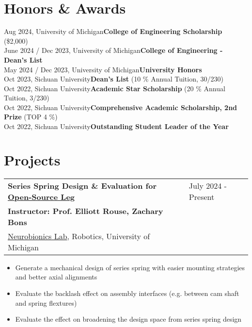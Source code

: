 \documentclass[letter,12pt]{article}
\begin{document}
\section{Honors \& Awards}

\small
{
    Aug 2024, University of Michigan\hfill \textbf{College of Engineering Scholarship} (\$2,000)\\
    June 2024 / Dec 2023, University of Michigan\hfill \textbf{College of Engineering - Dean's List}\\
    May 2024 / Dec 2023, University of Michigan\hfill \textbf{University Honors}\\
    Oct 2023, Sichuan University\hfill \textbf{Dean's List} (10 \% Annual Tuition, 30/230)\\
    Oct 2022, Sichuan University\hfill \textbf{Academic Star Scholarship} (20 \% Annual Tuition, 3/230)\\
    Oct 2022, Sichuan University\hfill \textbf{Comprehensive Academic Scholarship, 2nd Prize} (TOP 4 \%)\\
    Oct 2022, Sichuan University\hfill \textbf{Outstanding Student Leader of the Year}\\
}



\section{Projects}

\begin{tabularx}{\linewidth}{@{}l X@{}}
    \large \textbf{Series Spring Design \& Evaluation for \href{https://www.opensourceleg.org/about}{Open-Source Leg}} & \hfill July 2024 - Present \\
    \small{\textbf{Instructor: Prof. Elliott Rouse, Zachary Bons}} & \hfill {} \\
    \small{\href{https://neurobionics.robotics.umich.edu/}{Neurobionics Lab}, Robotics, University of Michigan} & \hfill {} \\
    \end{tabularx}
    

    \begin{itemize}[
        rightmargin=2cm
    ]
        \setlength{\itemsep}{1pt}
        \setlength{\parskip}{0pt}
        \setlength{\parsep}{0pt}
        \item {Generate a mechanical design of series spring with easier mounting strategies and better axial alignments}
        \item {Evaluate the backlash effect on assembly interfaces (e.g. between cam shaft and spring flextures)}
        \item {Evaluate the effect on broadening the design space from series spring design}
    \end{itemize}
\end{document}
